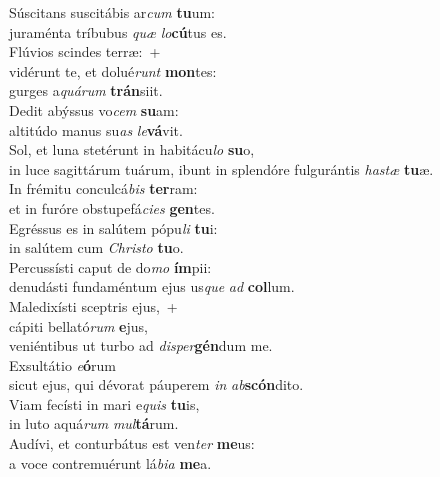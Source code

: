 \evenverse Súscitans suscitábis ar\textit{cum} \textbf{tu}um:~\*\\
\evenverse juraménta tríbubus \textit{quæ} \textit{lo}\textbf{cú}tus es.\\
\oddverse Flúvios scindes terræ:~+\\
\oddverse  vidérunt te, et dolué\textit{runt} \textbf{mon}tes:~\*\\
\oddverse gurges a\textit{quá}\textit{rum} \textbf{trán}siit.\\
\evenverse Dedit abýssus vo\textit{cem} \textbf{su}am:~\*\\
\evenverse altitúdo manus su\textit{as} \textit{le}\textbf{vá}vit.\\
\oddverse Sol, et luna stetérunt in habitácu\textit{lo} \textbf{su}o,~\*\\
\oddverse in luce sagittárum tuárum, ibunt in splendóre fulgurántis \textit{ha}\textit{stæ} \textbf{tu}æ.\\
\evenverse In frémitu conculcá\textit{bis} \textbf{ter}ram:~\*\\
\evenverse et in furóre obstupefá\textit{ci}\textit{es} \textbf{gen}tes.\\
\oddverse Egréssus es in salútem pópu\textit{li} \textbf{tu}i:~\*\\
\oddverse in salútem cum \textit{Chri}\textit{sto} \textbf{tu}o.\\
\evenverse Percussísti caput de do\textit{mo} \textbf{ím}pii:~\*\\
\evenverse denudásti fundaméntum ejus us\textit{que} \textit{ad} \textbf{col}lum.\\
\oddverse Maledixísti sceptris ejus,~+\\
\oddverse  cápiti bellató\textit{rum} \textbf{e}jus,~\*\\
\oddverse veniéntibus ut turbo ad \textit{di}\textit{sper}\textbf{gén}dum me.\\
\evenverse Exsultátio \textit{e}\textbf{ó}rum~\*\\
\evenverse sicut ejus, qui dévorat páuperem \textit{in} \textit{ab}\textbf{scón}dito.\\
\oddverse Viam fecísti in mari e\textit{quis} \textbf{tu}is,~\*\\
\oddverse in luto aquá\textit{rum} \textit{mul}\textbf{tá}rum.\\
\evenverse Audívi, et conturbátus est ven\textit{ter} \textbf{me}us:~\*\\
\evenverse a voce contremuérunt lá\textit{bi}\textit{a} \textbf{me}a.\\

